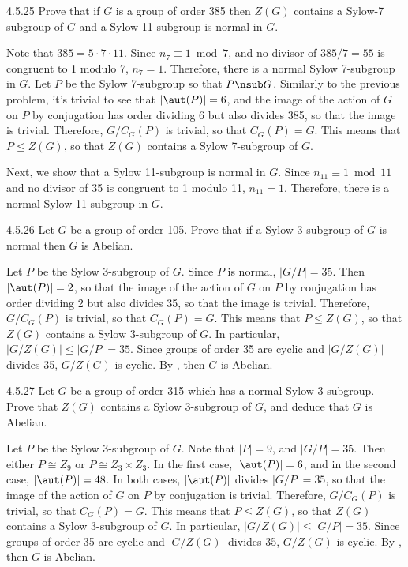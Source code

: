 \begin{exercise}{4.5.25}
	Prove that if $G$ is a group of order 385 then $Z(G)$ contains a Sylow-7 subgroup of $G$ and a Sylow 11-subgroup is normal in $G$.
\end{exercise}

\begin{sol}
	Note that $385 = 5 \cdot 7 \cdot 11$.
	Since $n_7 \equiv 1 \bmod 7$, and no divisor of $385/7 = 55$ is congruent to 1 modulo 7, $n_7 = 1$.
	Therefore, there is a normal Sylow 7-subgroup in $G$.
	Let $P$ be the Sylow 7-subgroup so that $P \nsub G$.
	Similarly to the previous problem, it's trivial to see that $|\aut(P)| = 6$, and the image of the action of $G$ on $P$ by conjugation has order dividing 6 but also divides 385, so that the image is trivial.
	Therefore, $G/C_G(P)$ is trivial, so that $C_G(P) = G$.
	This means that $P \leq Z(G)$, so that $Z(G)$ contains a Sylow 7-subgroup of $G$.

	Next, we show that a Sylow 11-subgroup is normal in $G$.
	Since $n_{11} \equiv 1 \bmod 11$ and no divisor of 35 is congruent to 1 modulo 11, $n_{11} = 1$.
	Therefore, there is a normal Sylow 11-subgroup in $G$.
\end{sol}

\begin{exercise}{4.5.26}
	Let $G$ be a group of order 105.
	Prove that if a Sylow 3-subgroup of $G$ is normal then $G$ is Abelian.
\end{exercise}

\begin{sol}
	Let $P$ be the Sylow 3-subgroup of $G$.
	Since $P$ is normal, $|G/P| = 35$.
	Then $|\aut(P)| = 2$, so that the image of the action of $G$ on $P$ by conjugation has order dividing 2 but also divides 35, so that the image is trivial.
	Therefore, $G/C_G(P)$ is trivial, so that $C_G(P) = G$.
	This means that $P \leq Z(G)$, so that $Z(G)$ contains a Sylow 3-subgroup of $G$.
	In particular, $|G/Z(G)| \leq |G/P| = 35$.
	Since groups of order 35 are cyclic and $|G/Z(G)|$ divides 35, $G/Z(G)$ is cyclic.
	By , then $G$ is Abelian.
\end{sol}

\begin{exercise}{4.5.27}
	Let $G$ be a group of order 315 which has a normal Sylow 3-subgroup.
	Prove that $Z(G)$ contains a Sylow 3-subgroup of $G$, and deduce that $G$ is Abelian.
\end{exercise}

\begin{sol}
	Let $P$ be the Sylow 3-subgroup of $G$.
	Note that $|P| = 9$, and $|G/P| = 35$.
	Then either $P \cong Z_9$ or $P \cong Z_3 \times Z_3$.
	In the first case, $|\aut(P)| = 6$, and in the second case, $|\aut(P)| = 48$.
	In both cases, $|\aut(P)|$ divides $|G/P| = 35$, so that the image of the action of $G$ on $P$ by conjugation is trivial.
	Therefore, $G/C_G(P)$ is trivial, so that $C_G(P) = G$.
	This means that $P \leq Z(G)$, so that $Z(G)$ contains a Sylow 3-subgroup of $G$.
	In particular, $|G/Z(G)| \leq |G/P| = 35$.
	Since groups of order 35 are cyclic and $|G/Z(G)|$ divides 35, $G/Z(G)$ is cyclic.
	By , then $G$ is Abelian.
\end{sol}

